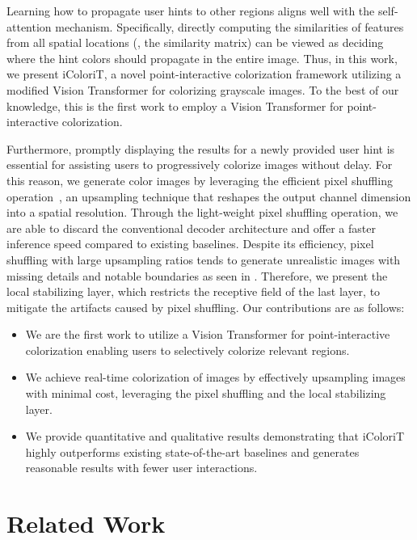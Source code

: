 \documentclass[10pt,twocolumn,letterpaper]{article}
\begin{document}
Learning how to propagate user hints to other regions aligns well with the self-attention mechanism. 
Specifically, directly computing the similarities of features from all spatial locations (\ie, the similarity matrix) can be viewed as deciding where the hint colors should propagate in the entire image. 
Thus, in this work, we present iColoriT, a novel point-interactive colorization framework utilizing a modified Vision Transformer for colorizing grayscale images. 
To the best of our knowledge, this is the first work to employ a Vision Transformer for point-interactive colorization. 

Furthermore, promptly displaying the results for a newly provided user hint is essential for assisting users to progressively colorize images without delay. 
For this reason, we generate color images by leveraging the efficient pixel shuffling operation~\cite{pixelshuffle}, an upsampling technique that reshapes the output channel dimension into a spatial resolution. 
Through the light-weight pixel shuffling operation, we are able to discard the conventional decoder architecture and offer a faster inference speed compared to existing baselines. 
Despite its efficiency, pixel shuffling with large upsampling ratios tends to generate unrealistic images with missing details and notable boundaries as seen in . 
Therefore, we present the local stabilizing layer, which restricts the receptive field of the last layer, to mitigate the artifacts caused by pixel shuffling. 
Our contributions are as follows:
\begin{itemize}
    \item We are the first work to utilize a Vision Transformer for point-interactive colorization enabling users to selectively colorize relevant regions. 
    \item We achieve real-time colorization of images by effectively upsampling images with minimal cost, leveraging the pixel shuffling and the local stabilizing layer. 
    \item We provide quantitative and qualitative results demonstrating that iColoriT highly outperforms existing state-of-the-art baselines and generates reasonable results with fewer user interactions.
\end{itemize}


\vspace{-0.2cm}
\section{Related Work}
\label{sec:related_work}
\vspace{-0.2cm}
\end{document}

